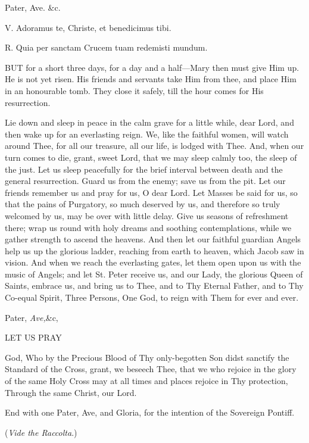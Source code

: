 Pater, Ave. \&c.


V. Adoramus te, Christe, et
benedicimus tibi.

R. Quia per sanctam Crucem tuam redemisti mundum.

BUT for a short three
days, for a day and a half—Mary then must give Him up. He is not yet
risen. His friends and servants take Him from thee, and place Him in an
honourable tomb. They close it safely, till the hour comes for His
resurrection.

Lie down and sleep in peace in
the calm grave for a little while, dear Lord, and then wake up for an
everlasting reign. We, like the faithful women, will watch around Thee,
for all our treasure, all our life, is lodged with Thee. And, when our
turn comes to die, grant, sweet Lord, that we may sleep calmly too, the
sleep of the just. Let us sleep peacefully for the brief interval
between death and the general resurrection. Guard us from the enemy;
save us from the pit. Let our friends remember us and pray for us, O
dear Lord. Let Masses be said for us, so that the pains of Purgatory, so
much deserved by us, and therefore so truly welcomed by us, may be over
with little delay. Give us seasons of refreshment there; wrap us round
with holy dreams and soothing contemplations, while we gather strength
to ascend the heavens. And then let our faithful guardian Angels help us
up the glorious ladder, reaching from earth to heaven, which Jacob
saw in vision. And when we reach the everlasting gates, let them open
upon us with the music of Angels; and let St. Peter receive us, and our
Lady, the glorious Queen of Saints, embrace us, and bring us to Thee,
and to Thy Eternal Father, and to Thy Co-equal Spirit, Three Persons,
One God, to reign with Them for ever and ever.

Pater, \emph{Ave,}\&c,

LET
US PRAY

God, Who by the Precious Blood
of Thy only-begotten Son didst sanctify the Standard of the Cross,
grant, we beseech Thee, that we who rejoice in the glory of the same
Holy Cross may at all times and places rejoice in Thy protection,
Through the same Christ, our Lord.

End with one Pater, Ave, and
Gloria, for the intention of the Sovereign Pontiff.

(\emph{Vide the Raccolta}.)


